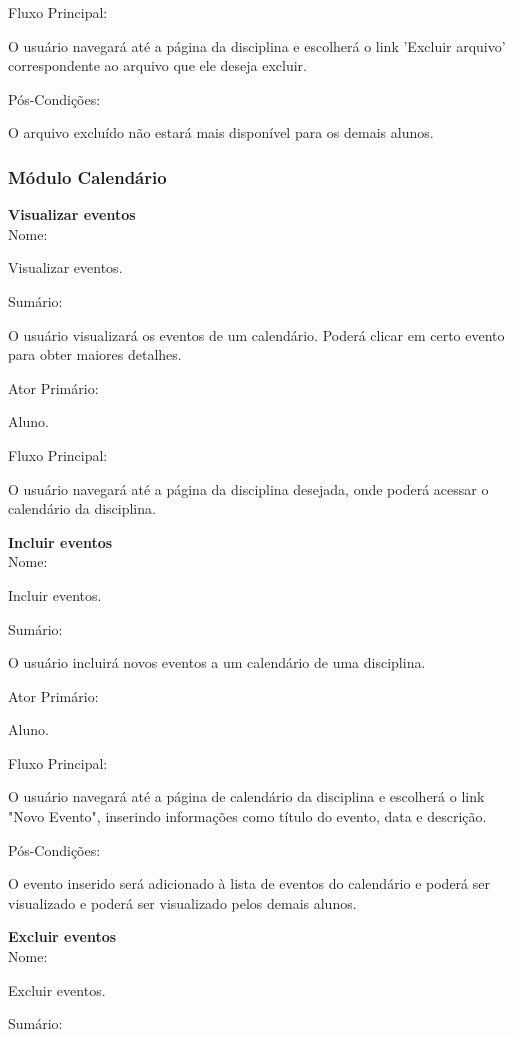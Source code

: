 \documentclass[11pt]{article}
\begin{document}
Fluxo Principal:

      O usuário navegará até a página da disciplina e escolherá o link 'Excluir arquivo' correspondente ao arquivo que ele deseja excluir. 

Pós-Condições:

      O arquivo excluído não estará mais disponível para os demais alunos. 

\subsubsection{Módulo Calendário}
\textbf{Visualizar eventos}
\\

Nome:

      Visualizar eventos. 

Sumário:

      O usuário visualizará os eventos de um calendário. Poderá clicar em certo evento para obter maiores detalhes. 

Ator Primário:

      Aluno. 

Fluxo Principal:

      O usuário navegará até a página da disciplina desejada, onde poderá acessar o calendário da disciplina. 

\textbf{Incluir eventos}
\\

Nome:

      Incluir eventos. 

Sumário:

      O usuário incluirá novos eventos a um calendário de uma disciplina. 

Ator Primário:

      Aluno. 

Fluxo Principal:

      O usuário navegará até a página de calendário da disciplina e escolherá o link "Novo Evento", inserindo informações como título do evento, data e descrição. 

Pós-Condições:

      O evento inserido será adicionado à lista de eventos do calendário e poderá ser visualizado e poderá ser visualizado pelos demais alunos. 

\textbf{Excluir eventos}
\\

Nome:

      Excluir eventos. 

Sumário:
\end{document}
